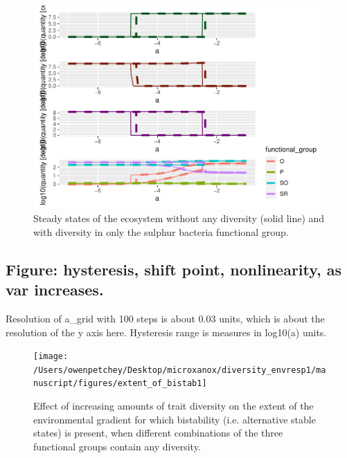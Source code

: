 \documentclass{article}
\begin{document}
\begin{figure}

{\centering \includegraphics[width=1\linewidth]{article_files/figure-latex/SBPB_var2-1} 

}

\caption{Steady states of the ecosystem without any diversity (solid line) and with diversity in only the sulphur bacteria functional group.}\label{fig:SBPB_var2}
\end{figure}

\hypertarget{figure-hysteresis-shift-point-nonlinearity-as-var-increases.}{%
\subsection{Figure: hysteresis, shift point, nonlinearity, as var
increases.}\label{figure-hysteresis-shift-point-nonlinearity-as-var-increases.}}

Resolution of a\_grid with 100 steps is about 0.03 units, which is about
the resolution of the y axis here. Hysteresis range is measures in
log10(a) units.

\begin{figure}

{\centering \texttt{[image: /Users/owenpetchey/Desktop/microxanox/diversity\_envresp1/manuscript/figures/extent\_of\_bistab1]} 

}

\caption{Effect of increasing amounts of trait diversity on the extent of the environmental gradient for which bistability (i.e. alternative stable states) is present, when different combinations of the three functional groups contain any diversity.}\label{fig:stab1}
\end{figure}
\end{document}

